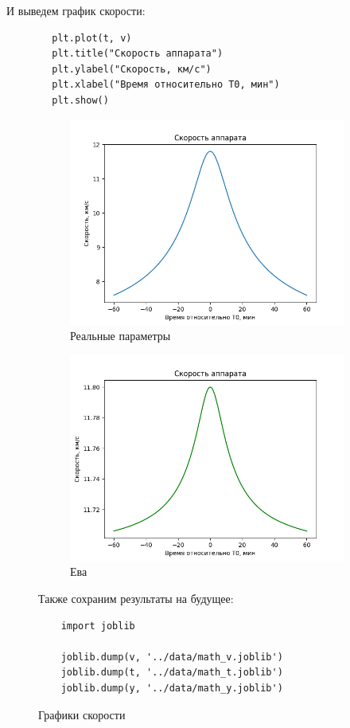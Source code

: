 \documentclass{article}
\begin{document}
    И выведем график скорости:
    \begin{verbatim}
        plt.plot(t, v)
        plt.title("Скорость аппарата")
        plt.ylabel("Скорость, км/с")
        plt.xlabel("Время относительно T0, мин")
        plt.show()
    \end{verbatim}
    \begin{figure}[H]
    \begin{subfigure}{0.5\textwidth}
        \includegraphics[width=1\linewidth]{images/speed_graph.png}
        \caption{Реальные параметры}
    \end{subfigure}
    \begin{subfigure}{0.5\textwidth}
        \includegraphics[width=1\linewidth]{images/eve_speed.png}
        \caption{Ева}
    \end{subfigure}
    \caption{Графики скорости}
    Также сохраним результаты на будущее:
    \begin{verbatim}
    import joblib

    joblib.dump(v, '../data/math_v.joblib')
    joblib.dump(t, '../data/math_t.joblib')
    joblib.dump(y, '../data/math_y.joblib')
    \end{verbatim}
    \end{figure}
\end{document}
